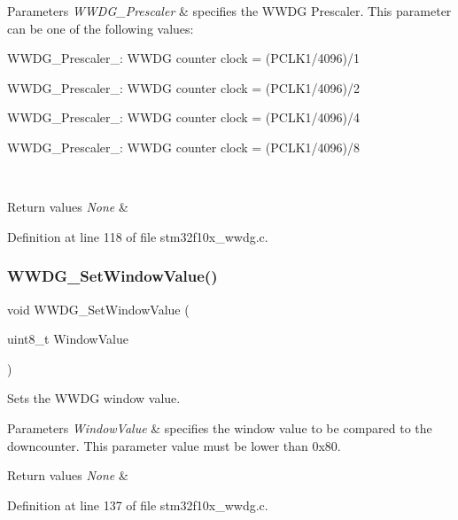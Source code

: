 \begin{DoxyParams}{Parameters}
{\em W\+W\+D\+G\+\_\+\+Prescaler} & specifies the W\+W\+DG Prescaler. This parameter can be one of the following values\+: \begin{DoxyItemize}
\item W\+W\+D\+G\+\_\+\+Prescaler\+\_\+: W\+W\+DG counter clock = (P\+C\+L\+K1/4096)/1 \item W\+W\+D\+G\+\_\+\+Prescaler\+\_\+: W\+W\+DG counter clock = (P\+C\+L\+K1/4096)/2 \item W\+W\+D\+G\+\_\+\+Prescaler\+\_\+: W\+W\+DG counter clock = (P\+C\+L\+K1/4096)/4 \item W\+W\+D\+G\+\_\+\+Prescaler\+\_\+: W\+W\+DG counter clock = (P\+C\+L\+K1/4096)/8 \end{DoxyItemize}
\\
\hline
\end{DoxyParams}

\begin{DoxyRetVals}{Return values}
{\em None} & \\
\hline
\end{DoxyRetVals}


Definition at line 118 of file stm32f10x\+\_\+wwdg.\+c.

\mbox{\label{group___w_w_d_g___exported___functions_gaf44a7bf8bf6b11b41cd89ff521fdd5a5}} 
\subsubsection{\texorpdfstring{W\+W\+D\+G\+\_\+\+Set\+Window\+Value()}{WWDG\_SetWindowValue()}}
{\footnotesize\ttfamily void W\+W\+D\+G\+\_\+\+Set\+Window\+Value (\begin{DoxyParamCaption}\item[{uint8\+\_\+t}]{Window\+Value }\end{DoxyParamCaption})}



Sets the W\+W\+DG window value. 


\begin{DoxyParams}{Parameters}
{\em Window\+Value} & specifies the window value to be compared to the downcounter. This parameter value must be lower than 0x80. \\
\hline
\end{DoxyParams}

\begin{DoxyRetVals}{Return values}
{\em None} & \\
\hline
\end{DoxyRetVals}


Definition at line 137 of file stm32f10x\+\_\+wwdg.\+c.

